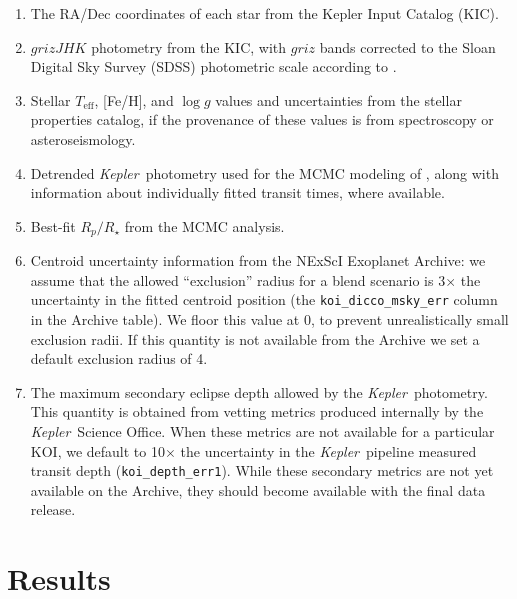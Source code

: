 \documentclass{emulateapj}
\newcommand{\sectlabel}[1]{\label{sect:#1}}
\newcommand{\nattempted}{8141}
\newcommand{\ntryfail}{112}
\newcommand{\kepler}{\textit{Kepler}}
\newcommand{\vespa}{\texttt{vespa}}
\begin{document}
\begin{enumerate}
\item The RA/Dec coordinates of each star from the Kepler Input
  Catalog (KIC).
\item $grizJHK$ photometry from the KIC, with $griz$ bands corrected
  to the Sloan Digital Sky Survey (SDSS) photometric scale according
  to \citet{Pinsonneault:2012}.
\item Stellar $T_\mathrm{eff}$, [Fe/H], and $\log g$ values and
  uncertainties from the \citet{Huber:2014} stellar properties
  catalog, if the provenance of these values is from spectroscopy or
  asteroseismology.
\item Detrended \kepler\ photometry used for the MCMC modeling of
  \citet{Rowe:2015}, along with information about individually fitted
  transit times, where available.  
\item Best-fit $R_p/R_\star$ from the \citet{Rowe:2015} MCMC analysis.
\item Centroid uncertainty information from the NExScI Exoplanet
  Archive: we assume that the allowed ``exclusion'' radius for a blend
  scenario is 3$\times$ the uncertainty in the fitted centroid
  position (the \verb|koi_dicco_msky_err| column in the Archive
  table).  We floor this value at 0, to prevent unrealistically
  small exclusion radii.  If this quantity is not available from the
  Archive we set a default exclusion radius of 4\arcsec.
\item The maximum secondary eclipse depth allowed by the
  \kepler\ photometry.  This quantity is obtained from vetting
  metrics produced internally by the \kepler\ Science Office.  When
  these metrics are not available for a particular KOI, we
  default to 10$\times$ the uncertainty in the \kepler\ pipeline
  measured transit depth (\verb|koi_depth_err1|).  While these
  secondary metrics are not yet available on the Archive, they should
  become available with the final data release.  
  
\end{enumerate}




\section{Results}
\sectlabel{results}
\end{document}

